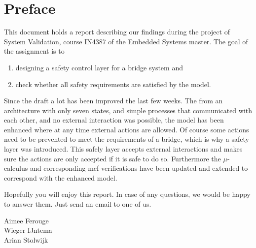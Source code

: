 \newpage
\section*{Preface}

This document holds a report describing our findings during the project of System Validation, course IN4387 of the Embedded Systems master.
The goal of the assignment is to
%
\begin{enumerate}
	\item designing a safety control layer for a bridge system and
	\item check whether all safety requirements are satisfied by the model.
\end{enumerate}
%

Since the draft a lot has been improved the last few weeks. The from an
architecture with only seven states, and simple processes that communicated
with each other, and no external interaction was possible, the model has been
enhanced where at any time external actions are allowed. Of course some actions
need to be prevented to meet the requirements of a bridge, which is why a
safety layer was introduced. This safely layer accepts external interactions
and makes sure the actions are only accepted if it is safe to do so.
Furthermore the $\mu$-calculus and corresponding mcf verifications have been
updated and extended to correspond with the enhanced model.

Hopefully you will enjoy this report. In case of any questions, we would be
happy to answer them. Just send an email to one of us.

\vspace{+50pt}
Aimee Ferouge\\
Wieger IJntema\\
Arian Stolwijk


\newpage
